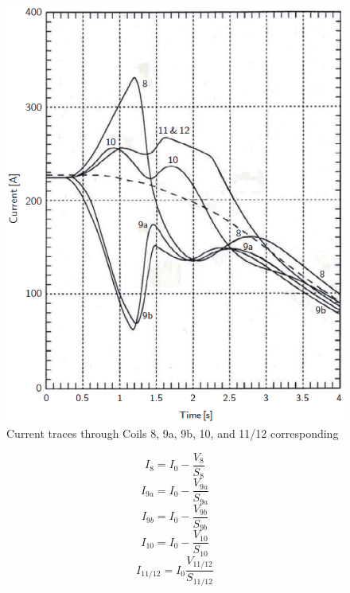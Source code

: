 \begin{figure}
	\centering
	\includegraphics[scale=0.6]{chpt8/figs/fig8.29.eps}
	\caption{Current traces through Coils 8, 9a, 9b, 10, and 11/12 corresponding}
\end{figure}



\begin{equation}%
I_8=I_0-\frac{V_8}{S_8}
\end{equation}
\begin{equation}%
I_{9a}=I_0-\frac{V_{9a}}{S_{9a}}
\end{equation}
\begin{equation}%
I_{9b}=I_0-\frac{V_{9b}}{S_{9b}}
\end{equation}
\begin{equation}%
I_{10}=I_0-\frac{V_{10}}{S_{10}}
\end{equation}
\begin{equation}%
I_{11/12}=I_0\frac{V_{11/12}}{S_{11/12}}
\end{equation}


